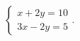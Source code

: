 $\displaystyle
\left\{
\begin{array}{l}
\displaystyle x + 2 y = 10 \\
\displaystyle 3 x - 2y = 5
\end{array}
\right.
$. %
